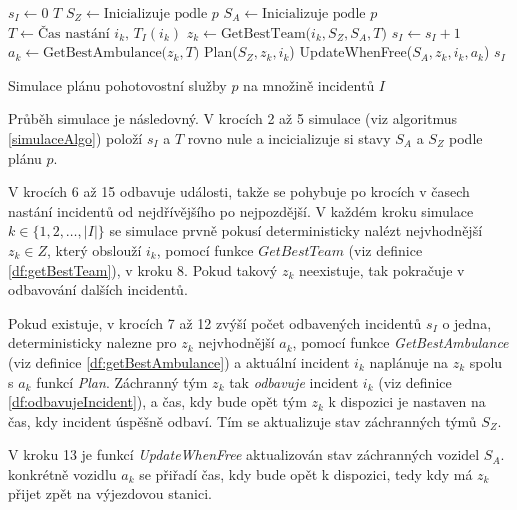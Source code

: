 \begin{algorithm}[H]
  \begin{algorithmic}[1]
    \State $s_I \gets 0$
    \State $T$ 
    \State $S_Z \gets \mbox{Inicializuje podle $p$}$
    \State $S_A \gets \mbox{Inicializuje podle $p$}$
      \State $T \gets \mbox{Čas nastání $i_k$, $T_I(i_k)$}$
      \State $z_k \gets \mbox{GetBestTeam($i_k, S_Z, S_A, T$)}$
        \State $s_I \gets s_I + 1$
        \State $a_k \gets \mbox{GetBestAmbulance($z_k, T$)}$
        \State Plan($S_Z, z_k, i_k$)
        \State UpdateWhenFree($S_A, z_k, i_k, a_k$)
      \EndIf
    \EndFor
    \State \Return $s_I$
  \EndFunction
  \end{algorithmic}
  \caption{Simulace plánu pohotovostní služby $p$ na množině incidentů $I$}
  \label{simulaceAlgo}
\end{algorithm}

\vspace*{10px}

Průběh simulace je následovný. 
V krocích 2 až 5 simulace (viz algoritmus \ref{simulaceAlgo}) položí $s_I$ a $T$ rovno nule
a incicializuje si stavy $S_A$ a $S_Z$ podle plánu $p$.

V krocích 6 až 15 odbavuje události, takže se pohybuje po krocích v časech nastání incidentů od nejdřívějšího po nejpozdější.
V každém kroku simulace $k \in \{ 1, 2, \dots , |I|\}$ se simulace prvně pokusí deterministicky nalézt nejvhodnější $z_k \in Z$, který obslouží $i_k$,
pomocí funkce $\textit{GetBestTeam}$ (viz definice \ref{df:getBestTeam}), v kroku 8.
Pokud takový $z_k$ neexistuje, tak pokračuje v odbavování dalších incidentů.

Pokud existuje, v krocích 7 až 12 zvýší počet odbavených incidentů $s_I$ o jedna,
deterministicky nalezne pro $z_k$ nejvhodnější $a_k$, pomocí funkce \textit{GetBestAmbulance} (viz definice \ref{df:getBestAmbulance}) a
aktuální incident $i_k$ naplánuje na $z_k$ spolu s $a_k$ funkcí \textit{Plan}.
Záchranný tým $z_k$ tak \textit{odbavuje} incident $i_k$ (viz definice \ref{df:odbavujeIncident}), a čas, kdy bude opět tým $z_k$ k dispozici je nastaven na čas, kdy incident úspěšně odbaví. 
Tím se aktualizuje stav záchranných týmů $S_Z$.

V kroku 13 je funkcí \textit{UpdateWhenFree} aktualizován stav záchranných vozidel $S_A$.
konkrétně vozidlu $a_k$ se přiřadí čas, kdy bude opět k dispozici, tedy kdy má $z_k$ přijet zpět na výjezdovou stanici.

